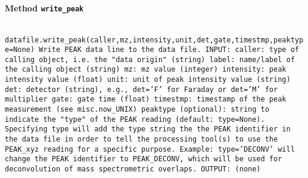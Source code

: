 \paragraph{Method \texttt{write_peak}}
\vspace{1ex}
\texttt{\newline
datafile.write_peak(caller,mz,intensity,unit,det,gate,timestmp,peaktype=None)\newline
\newline
Write PEAK data line to the data file.\newline
\newline
INPUT:\newline
caller: type of calling object, i.e. the "data origin" (string)\newline
label: name/label of the calling object (string)\newline
mz: mz value (integer)\newline
intensity: peak intensity value (float)\newline
unit: unit of peak intensity value (string)\newline
det: detector (string), e.g., det='F' for Faraday or det='M' for multiplier\newline
gate: gate time (float)\newline
timestmp: timestamp of the peak measurement (see misc.now_UNIX)\newline
peaktype (optional): string to indicate the "type" of the PEAK reading (default: type=None). Specifying type will add the type string the the PEAK identifier in the data file in order to tell the processing tool(s) to use the PEAK_xyz reading for a specific purpose. Example: type='DECONV' will change the PEAK identifier to PEAK_DECONV, which will be used for deconvolution of mass spectrometric overlaps.\newline
\newline
OUTPUT:\newline
(none)\newline
\newline
}

